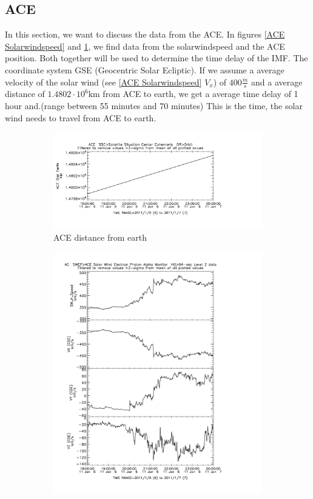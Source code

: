 \documentclass[10pt,a4paper]{article}
\begin{document}
\subsection{ACE}
In this section, we want to discuss the data from the ACE. In figures \ref{ACE Solarwindspeed} and \ref{ACE distance}, we find data from the solarwindspeed and the ACE position. Both together will be used to determine the time delay of the IMF. The coordinate system GSE (Geocentric Solar Ecliptic). If we assume a average velocity of the solar wind (see \ref{ACE Solarwindspeed} $V_x$) of $400 \frac{m}{s}$ and a average distance of $1.4802 \cdot 10^{6} \mathrm{km}$ from ACE to earth, we get a average time delay of 1 hour and.(range between 55 minutes and 70 minutes) This is the time, the solar wind needs to travel from ACE to earth. 

\begin{figure}[h]
\centering
\begin{subfigure}{0.45\textwidth}
\centering
	\includegraphics[width=\textwidth]{ACE_distance.pdf}
	\caption{ ACE distance from earth \label{ACE distance}}
\end{subfigure}
\begin{subfigure}{0.45\textwidth}
\centering
	\includegraphics[width=\textwidth]{ACE_solarwindspeed.pdf}

\end{subfigure}
\end{figure}
\end{document}
